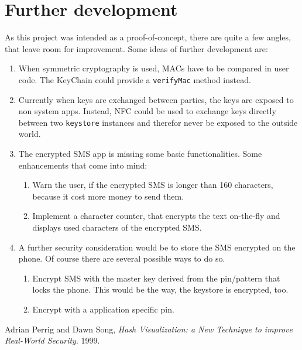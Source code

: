 \documentclass[a4paper,draft]{scrartcl}
\begin{document}
\section{Further development}
	As this project was intended as a proof-of-concept, there are quite a few angles, that leave room for improvement. Some ideas of further development are:
	\begin{enumerate}
		\item When symmetric cryptography is used, MACs have to be compared in user code. The KeyChain could provide a \texttt{verifyMac} method instead.
		\item Currently when keys are exchanged between parties, the keys are exposed to non system apps. Instead, NFC could be used to exchange keys directly between two \texttt{keystore} instances and therefor never be exposed to the outside world.
		\item The encrypted SMS app is missing some basic functionalities. Some enhancements that come into mind:
		\begin{enumerate}
			\item Warn the user, if the encrypted SMS is longer than 160 characters, because it cost more money to send them.
			\item Implement a character counter, that encrypts the text on-the-fly and displays used characters of the encrypted SMS.
		\end{enumerate}
		\item A further security consideration would be to store the SMS encrypted on the phone. Of course there are several possible ways to do so.
		\begin{enumerate}
			\item Encrypt SMS with the master key derived from the pin/pattern that locks the phone. This would be the way, the keystore is encrypted, too.
			\item Encrypt with a application specific pin.
		\end{enumerate}
	\end{enumerate}

\begin{thebibliography}{9}
		Adrian Perrig and Dawn Song,
		{\em Hash Visualization: a New Technique to improve Real-World Security}.
		1999.
\end{thebibliography}
\end{document}
